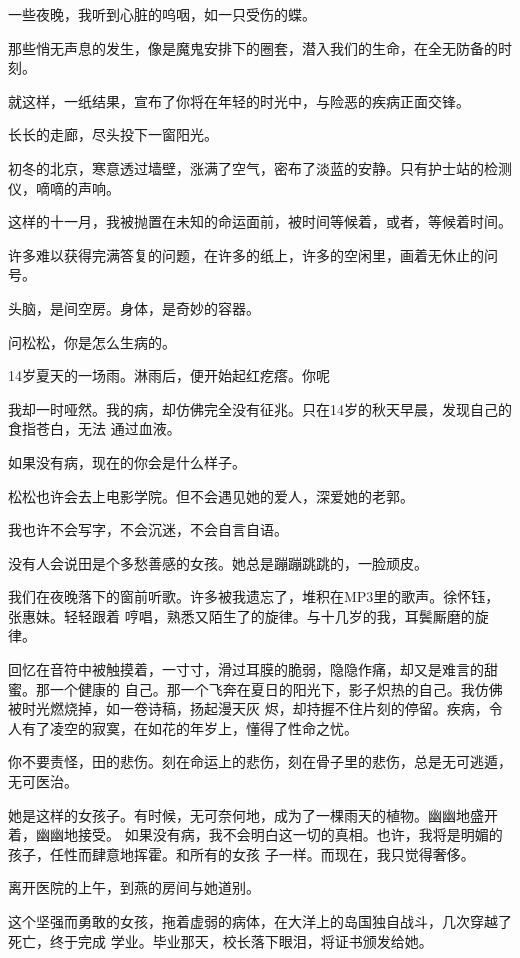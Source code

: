 		一些夜晚，我听到心脏的呜咽，如一只受伤的蝶。\par
		那些悄无声息的发生，像是魔鬼安排下的圈套，潜入我们的生命，在全无防备的时刻。\par
		就这样，一纸结果，宣布了你将在年轻的时光中，与险恶的疾病正面交锋。\par
		长长的走廊，尽头投下一窗阳光。\par
		初冬的北京，寒意透过墙壁，涨满了空气，密布了淡蓝的安静。只有护士站的检测仪，嘀嘀的声响。\par
		这样的十一月，我被抛置在未知的命运面前，被时间等候着，或者，等候着时间。\par
		许多难以获得完满答复的问题，在许多的纸上，许多的空闲里，画着无休止的问号。\par
		头脑，是间空房。身体，是奇妙的容器。\par
		问松松，你是怎么生病的。\par
		14岁夏天的一场雨。淋雨后，便开始起红疙瘩。你呢

		我却一时哑然。我的病，却仿佛完全没有征兆。只在14岁的秋天早晨，发现自己的食指苍白，无法
	通过血液。

		如果没有病，现在的你会是什么样子。\par
		松松也许会去上电影学院。但不会遇见她的爱人，深爱她的老郭。\par
		我也许不会写字，不会沉迷，不会自言自语。\par
		没有人会说田是个多愁善感的女孩。她总是蹦蹦跳跳的，一脸顽皮。

		我们在夜晚落下的窗前听歌。许多被我遗忘了，堆积在MP3里的歌声。徐怀钰，张惠妹。轻轻跟着
	哼唱，熟悉又陌生了的旋律。与十几岁的我，耳鬓厮磨的旋律。

		回忆在音符中被触摸着，一寸寸，滑过耳膜的脆弱，隐隐作痛，却又是难言的甜蜜。那一个健康的
	自己。那一个飞奔在夏日的阳光下，影子炽热的自己。我仿佛被时光燃烧掉，如一卷诗稿，扬起漫天灰
	烬，却持握不住片刻的停留。疾病，令人有了凌空的寂寞，在如花的年岁上，懂得了性命之忧。

		你不要责怪，田的悲伤。刻在命运上的悲伤，刻在骨子里的悲伤，总是无可逃遁，无可医治。

		她是这样的女孩子。有时候，无可奈何地，成为了一棵雨天的植物。幽幽地盛开着，幽幽地接受。
	如果没有病，我不会明白这一切的真相。也许，我将是明媚的孩子，任性而肆意地挥霍。和所有的女孩
	子一样。而现在，我只觉得奢侈。

		离开医院的上午，到燕的房间与她道别。

		这个坚强而勇敢的女孩，拖着虚弱的病体，在大洋上的岛国独自战斗，几次穿越了死亡，终于完成
	学业。毕业那天，校长落下眼泪，将证书颁发给她。

